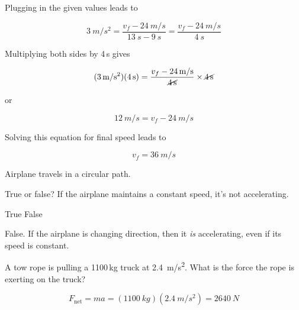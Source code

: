 \documentclass[answers]{exam}
\begin{document}
\begin{questions}
\begin{solutionorbox}[5cm]
Plugging in the given values leads to 

\begin{equation*}
    \SI{3}{m/s^2} = \frac{v_f - \SI{24}{m/s}}{\SI{13}{s} - \SI{9}{s}} =  \frac{v_f - \SI{24}{m/s}}{\SI{4}{s}}
\end{equation*}

Multiplying both sides by 4\,s gives

\begin{equation*}
    (\SI{3}{m/s^2})(\SI{4}{s}) = \frac{v_f - \SI{24}{m/s}}{\cancel{\SI{4}{s}}} \times \cancel{\SI{4}{s}}
\end{equation*}

or

\begin{equation*}
    \SI{12}{m/s} = v_f - \SI{24}{m/s}
\end{equation*}

Solving this equation for final speed leads to

\begin{equation*}
    \boxed{v_f = \SI{36}{m/s}}
\end{equation*}
\end{solutionorbox}

\question
Airplane travels in a circular path.

\begin{center}
\end{center}

True or false? If the airplane maintains a constant speed, it's not accelerating.

\begin{randomizeoneparchoices}[norandomize]
    \choice True
    \correctchoice False
\end{randomizeoneparchoices}

\begin{solutionorbox}
    False. If the airplane is changing direction, then it \textit{is} accelerating, even if its speed is constant.
\end{solutionorbox}

\question
A tow rope is pulling a 1100\,kg truck at \SI{2.4}{m/s^2}. What is the force the rope is exerting on the truck?

\begin{solutionorbox}[3cm]
\begin{equation*}
    F_\mathrm{net} = ma = (\SI{1100}{kg})(\SI{2.4}{m/s^2}) = \boxed{\SI{2640}{N}}
\end{equation*}
\end{solutionorbox}


\end{questions}
\end{document}
